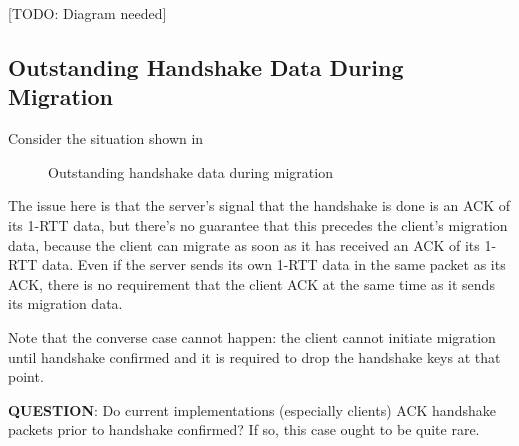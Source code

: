 \documentclass{article}
\begin{document}
[TODO: Diagram needed]

\subsection{Outstanding Handshake Data During Migration}
\label{sec:outst-handsh-data}

Consider the situation shown in 
\begin{figure}[H]
\begin{center}
\end{center}
\caption{Outstanding handshake data during migration}
\label{fig:outstanding-handshake-migration}
\end{figure}

The issue here is that the server's signal that the handshake
is done is an ACK of its 1-RTT data, but there's no guarantee
that this precedes the client's migration data, because the
client can migrate as soon as it has received an ACK of its
1-RTT data. Even if the server sends its own 1-RTT data in
the same packet as its ACK, there is no requirement that
the client ACK at the same time as it sends its migration
data.

Note that the converse case cannot happen: the client cannot
initiate migration until handshake confirmed and it is required
to drop the handshake keys at that point.

\textbf{QUESTION}: Do current implementations (especially clients)
ACK handshake packets prior to handshake confirmed? If so,
this case ought to be quite rare.
\end{document}
